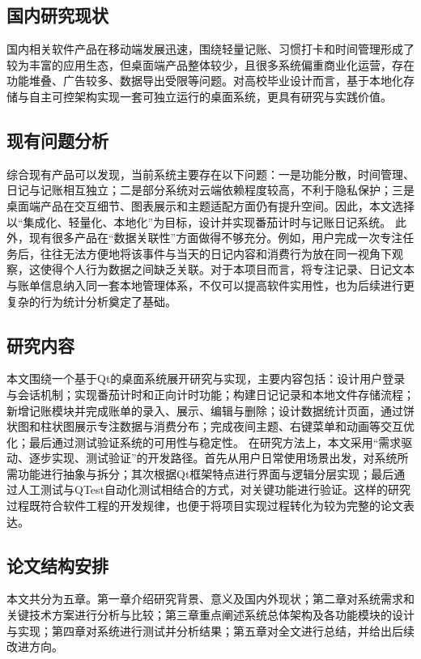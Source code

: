 \subsection{国内研究现状}
国内相关软件产品在移动端发展迅速，围绕轻量记账、习惯打卡和时间管理形成了较为丰富的应用生态，但桌面端产品整体较少，且很多系统偏重商业化运营，存在功能堆叠、广告较多、数据导出受限等问题。对高校毕业设计而言，基于本地化存储与自主可控架构实现一套可独立运行的桌面系统，更具有研究与实践价值。

\subsection{现有问题分析}
综合现有产品可以发现，当前系统主要存在以下问题：一是功能分散，时间管理、日记与记账相互独立；二是部分系统对云端依赖程度较高，不利于隐私保护；三是桌面端产品在交互细节、图表展示和主题适配方面仍有提升空间。因此，本文选择以“集成化、轻量化、本地化”为目标，设计并实现番茄计时与记账日记系统。
此外，现有很多产品在“数据关联性”方面做得不够充分。例如，用户完成一次专注任务后，往往无法方便地将该事件与当天的日记内容和消费行为放在同一视角下观察，这使得个人行为数据之间缺乏关联。对于本项目而言，将专注记录、日记文本与账单信息纳入同一套本地管理体系，不仅可以提高软件实用性，也为后续进行更复杂的行为统计分析奠定了基础。


\subsection{研究内容}
本文围绕一个基于Qt的桌面系统展开研究与实现，主要内容包括：设计用户登录与会话机制；实现番茄计时和正向计时功能；构建日记记录和本地文件存储流程；新增记账模块并完成账单的录入、展示、编辑与删除；设计数据统计页面，通过饼状图和柱状图展示专注数据与消费分布；完成夜间主题、右键菜单和动画等交互优化；最后通过测试验证系统的可用性与稳定性。
在研究方法上，本文采用“需求驱动、逐步实现、测试验证”的开发路径。首先从用户日常使用场景出发，对系统所需功能进行抽象与拆分；其次根据Qt框架特点进行界面与逻辑分层实现；最后通过人工测试与QTest自动化测试相结合的方式，对关键功能进行验证。这样的研究过程既符合软件工程的开发规律，也便于将项目实现过程转化为较为完整的论文表达。

\subsection{论文结构安排}
本文共分为五章。第一章介绍研究背景、意义及国内外现状；第二章对系统需求和关键技术方案进行分析与比较；第三章重点阐述系统总体架构及各功能模块的设计与实现；第四章对系统进行测试并分析结果；第五章对全文进行总结，并给出后续改进方向。